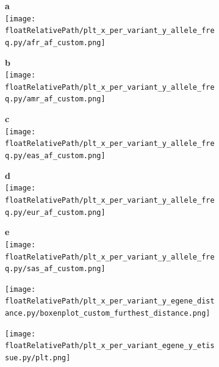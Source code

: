 \begin{figure}[!tbp]

    \begin{subfigure}[]{.49\textwidth}
        \textbf{a}
        \\
        \texttt{[image: \\floatRelativePath/plt\_x\_per\_variant\_y\_allele\_freq.py/afr\_af\_custom.png]}
    \end{subfigure}
%
    \begin{subfigure}[]{.49\textwidth}
        \textbf{b}
        \\
        \texttt{[image: \\floatRelativePath/plt\_x\_per\_variant\_y\_allele\_freq.py/amr\_af\_custom.png]}
    \end{subfigure}

    \begin{subfigure}[]{.49\textwidth}
        \textbf{c}
        \\
        \texttt{[image: \\floatRelativePath/plt\_x\_per\_variant\_y\_allele\_freq.py/eas\_af\_custom.png]}
    \end{subfigure}
%
    \centering
    \begin{subfigure}[]{.49\textwidth}
        \textbf{d}
        \\
        \texttt{[image: \\floatRelativePath/plt\_x\_per\_variant\_y\_allele\_freq.py/eur\_af\_custom.png]}
    \end{subfigure}

    \begin{subfigure}[]{.49\textwidth}
        \textbf{e}
        \\
        \texttt{[image: \\floatRelativePath/plt\_x\_per\_variant\_y\_allele\_freq.py/sas\_af\_custom.png]}
    \end{subfigure}

    \caption{}

\end{figure}


\begin{figure}[!ht]
    \centering
    \begin{subfigure}[]{.49\textwidth}
        \texttt{[image: \\floatRelativePath/plt\_x\_per\_variant\_y\_egene\_distance.py/boxenplot\_custom\_furthest\_distance.png]}
    \end{subfigure}

    \caption{}

\end{figure}


\begin{figure}[!ht]
    \centering
    \begin{subfigure}[]{.49\textwidth}
        \texttt{[image: \\floatRelativePath/plt\_x\_per\_variant\_egene\_y\_etissue.py/plt.png]}
    \end{subfigure}

    \caption{}

\end{figure}



